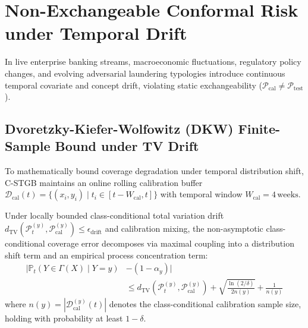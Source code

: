 \section[Conformal Risk under Non-Stationary Temporal Drift]{Non-Exchangeable Conformal Risk under Temporal Drift}
In live enterprise banking streams, macroeconomic fluctuations, regulatory policy changes, and evolving adversarial laundering typologies introduce continuous temporal covariate and concept drift, violating static exchangeability ($\mathcal{P}_{\text{cal}} \neq \mathcal{P}_{\text{test}}$).

\subsection{Dvoretzky-Kiefer-Wolfowitz (DKW) Finite-Sample Bound under TV Drift}
To mathematically bound coverage degradation under temporal distribution shift, C-STGB maintains an online rolling calibration buffer $\mathcal{D}_{\text{cal}}(t) = \{ (x_i, y_i) \mid t_i \in [t - W_{\text{cal}}, t] \}$ with temporal window $W_{\text{cal}} = 4\,\text{weeks}$.

\begin{theorem}
\label{thm:conformal_tv_bound}
Under locally bounded class-conditional total variation drift $d_{\mathrm{TV}}(\mathcal{P}_t^{(y)}, \mathcal{P}_{\text{cal}}^{(y)}) \le \epsilon_{\text{drift}}$ and calibration mixing, the non-asymptotic class-conditional coverage error decomposes via maximal coupling into a distribution shift term and an empirical process concentration term:
\begin{equation}
\begin{aligned}
\big| \mathbb{P}_{t}\left(Y \in \Gamma(X) \mid Y=y\right) & - (1 - \alpha_y) \big| \\
& \le d_{\mathrm{TV}}\left(\mathcal{P}_t^{(y)}, \mathcal{P}_{\text{cal}}^{(y)}\right) + \sqrt{\frac{\ln(2/\delta)}{2 n(y)}} + \frac{1}{n(y)}
\end{aligned}
\end{equation}
where $n(y) = |\mathcal{D}_{\text{cal}}^{(y)}(t)|$ denotes the class-conditional calibration sample size, holding with probability at least $1 - \delta$.
\end{theorem}

